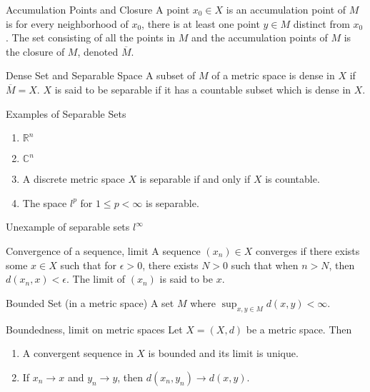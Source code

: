 \documentclass[avery5388,grid,frame]{flashcards}
\begin{document}
\begin{flashcard}[Definition]{Accumulation Points and Closure}
A point $x_0\in X$ is an accumulation point of $M$ is for every neighborhood of $x_0$, there is at least one point $y\in M$ distinct from $x_0$. The set consisting of all the points in $M$ and the accumulation points of $M$ is the closure of $M$, denoted $\overline{M}$.
\end{flashcard}

\begin{flashcard}[Definition]{Dense Set and Separable Space}
A subset of $M$ of a metric space is dense in $X$ if $\overline{M}=X$. $X$ is said to be separable if it has a countable subset which is dense in $X$.
\end{flashcard}

\begin{flashcard}[Example]{Examples of Separable Sets}
\begin{enumerate}
\item $\mathbb{R}^n$
\item $\mathbb{C}^n$
\item A discrete metric space $X$ is separable if and only if $X$ is countable.
\item The space $l^p$ for $1\leq p<\infty$ is separable.
\end{enumerate}
\end{flashcard}

\begin{flashcard}[Example]{Unexample of separable sets}
$l^\infty$
\end{flashcard}

\begin{flashcard}[Definition]{Convergence of a sequence, limit}
A sequence $(x_n)\in X$ converges if there exists some $x\in X$ such that for $\epsilon>0$, there exists $N>0$ such that when $n>N$, then $d(x_n,x)<\epsilon$. The limit of $(x_n)$ is said to be $x$.
\end{flashcard}

\begin{flashcard}[Definition]{Bounded Set (in a metric space)}
A set $M$ where $\sup_{x,y\in M}d(x,y)<\infty$.
\end{flashcard}

\begin{flashcard}[Theorem]{Boundedness, limit on metric spaces} 
Let $X=(X,d)$ be a metric space. Then
\begin{enumerate}
\item A convergent sequence in $X$ is bounded and its limit is unique.
\item If $x_n\rightarrow x$ and $y_n\rightarrow y$, then $d(x_n,y_n)\rightarrow d(x,y)$.
\end{enumerate}
\end{flashcard}
\end{document}
